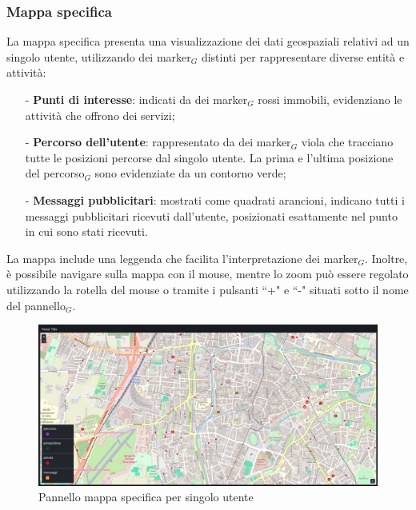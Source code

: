 \documentclass[10pt]{article}
\begin{document}
\begin{justify}
    \subsubsection{Mappa specifica}
    La mappa specifica presenta una visualizzazione dei dati geospaziali relativi ad un singolo utente, utilizzando dei marker$_G$ distinti per rappresentare diverse entità e attività:
    \begin{itemize}
        \item[-] \textbf{Punti di interesse}: indicati da dei marker$_G$ rossi immobili, evidenziano le attività che offrono dei servizi;
        \item[-] \textbf{Percorso dell'utente}: rappresentato da dei marker$_G$ viola che tracciano tutte le posizioni percorse dal singolo utente. La prima e l'ultima posizione del percorso$_G$ sono evidenziate da un contorno verde;
        \item[-] \textbf{Messaggi pubblicitari}: mostrati come quadrati arancioni, indicano tutti i messaggi pubblicitari ricevuti dall'utente, posizionati esattamente nel punto in cui sono stati ricevuti.
    \end{itemize}
    La mappa include una leggenda che facilita l'interpretazione dei marker$_G$. Inoltre, è possibile navigare sulla mappa con il mouse, mentre lo zoom può essere regolato utilizzando la rotella del mouse o tramite i pulsanti ``+" e ``-" situati sotto il nome del pannello$_G$.
    \begin{figure}[H]
    \centering
    \includegraphics[width=1\linewidth]{mappaspec.png}
    \caption{Pannello mappa specifica per singolo utente}
    \end{figure}


\end{justify}
\end{document}

